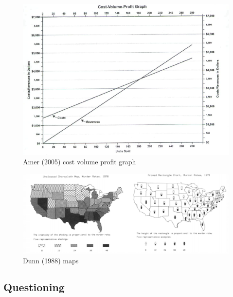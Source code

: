 \documentclass[print]{nuthesis}
\begin{document}
\begin{figure}[tbp]

{\centering \includegraphics[width=1\linewidth,]{images/amer-poggendorff-illusion} 

}

\caption{Amer (2005) cost volume profit graph}\label{fig:amer-poggendorff-illusion}
\end{figure}

\begin{figure}[tbp]

{\centering \includegraphics[width=1\linewidth,]{images/framed-murder-rate-map} 

}

\caption{Dunn (1988) maps}\label{fig:framed-murder-rate-map}
\end{figure}

\hypertarget{questioning}{%
\subsection{Questioning}\label{questioning}}
\end{document}

